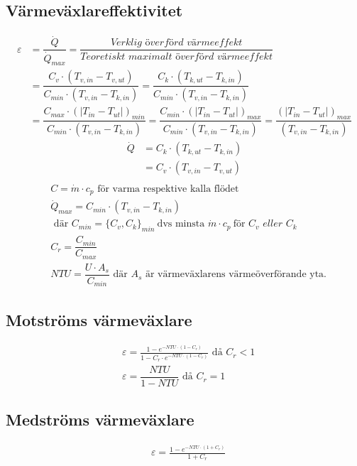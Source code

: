 	\subsection*{Värmeväxlareffektivitet}
	\begin{align*}
		\varepsilon & = \dfrac{\dot{Q}}{\dot{Q}_{max}}=
		\dfrac{\textit{Verklig överförd värmeeffekt}}{\textit{Teoretiskt maximalt överförd värmeeffekt}} \\
		& = \dfrac{C_v \cdot (T_{v,in} - T_{v,ut})}{C_{min} \cdot (T_{v,in} - T_{k,in})}
		 = \dfrac{C_k \cdot (T_{k,ut} - T_{k,in})}{C_{min} \cdot (T_{v,in} - T_{k,in})} \\
		& = \dfrac{C_{max} \cdot (\left| T_{in} - T_{ut}\right|)_{min}}{C_{min} \cdot (T_{v,in} - T_{k,in})}
		= \dfrac{C_{min} \cdot (\left| T_{in} - T_{ut}\right|)_{max}}{C_{min} \cdot (T_{v,in} - T_{k,in})} 
		= \dfrac{(\left|T_{in} - T_{ut}\right|)_{max}}{(T_{v,in} - T_{k,in})}
	\end{align*}
	\begin{align*}
		\dot{Q}&=C_k \cdot (T_{k,ut} - T_{k,in}) \\
		 &=C_v \cdot (T_{v,in} - T_{v,ut}) \\
	\end{align*}
	\vspace{-4em} %
	\begin{align*}
	& C = \dot{m} \cdot c_p \text{ för varma respektive kalla flödet} \\
	&\dot{Q}_{max}=C_{min} \cdot (T_{v,in} - T_{k,in}) \\
	& \text{ där } C_{min} = \{C_v, C_k\}_{min} \ \text{dvs minsta } \dot{m} \cdot c_p \ \text{för } C_v \textit{ eller } C_k\\
	& C_r = \dfrac{C_{min}}{C_{max}} \\
	&\textit{NTU}=\dfrac{U \cdot A_s}{C_{min}} \text{ där } A_s \text{ är värmeväxlarens värmeöverförande yta.}
	\end{align*}
	\subsection*{Motströms värmeväxlare}
	\begin{align*}
		& \varepsilon = \frac{1 - e^{-NTU \cdot (1 - C_r)}}{1 - C_r \cdot e^{-NTU \cdot (1 - C_r)}} \text{ då } C_r<1\\
		& \varepsilon = \dfrac{NTU}{1-NTU} \text{ då } C_r=1
	\end{align*}
	\subsection*{Medströms värmeväxlare}
	\begin{align*}
		& \varepsilon = \frac{1 - e^{-NTU \cdot (1 + C_r)}}{1 + C_r} 
	\end{align*}
